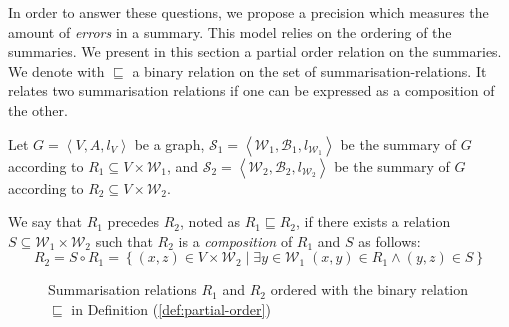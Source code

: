 In order to answer these questions, we propose a \gls{precision} which measures the amount of \emph{errors} in a summary. This model relies on the ordering of the summaries. We present in this section a partial order relation on the summaries.\\


We denote with $\sqsubseteq$ a binary relation on the set of \glspl{summarisation-relation}. It relates two summarisation relations if one can be expressed as a composition of the other.

\begin{definition}
	Let $G=\left\langle V, A, l_V \right\rangle$ be a graph, $\mathcal{S}_1 = \left\langle \mathcal{W}_1, \mathcal{B}_1, l_{\mathcal{W}_1} \right\rangle$ be the summary of $G$ according to $R_1 \subseteq V \times \mathcal{W}_1$, and $\mathcal{S}_2 = \left\langle \mathcal{W}_2, \mathcal{B}_2, l_{\mathcal{W}_2} \right\rangle$ be the summary of $G$ according to $R_2 \subseteq V \times \mathcal{W}_2$.

	We say that $R_1$ precedes $R_2$, noted as $R_1 \sqsubseteq R_2$, if there exists a relation $S \subseteq \mathcal{W}_1 \times \mathcal{W}_2$ such that $R_2$ is a \emph{composition} of $R_1$ and $S$ as follows:
	$$
	R_2 = S \circ R_1 = \left\lbrace (x, z) \in V \times \mathcal{W}_2 \mid \exists y \in \mathcal{W}_1\; (x, y) \in R_1 \wedge (y, z) \in S \right\rbrace
	$$
	\label{def:partial-order}
\end{definition}

\begin{figure}
	\centering
	\resizebox{.6\textwidth}{!}{
		
	}
	\caption{Summarisation relations $R_1$ and $R_2$ ordered with the binary relation $\sqsubseteq$ in Definition (\ref{def:partial-order})}
	\label{fig:partial-order}
\end{figure}

